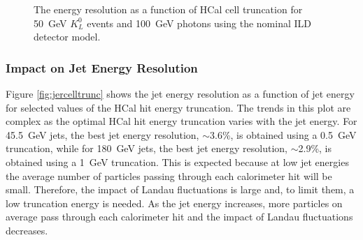 \begin{figure}[h!]
\caption[The energy resolution as a function of HCal cell truncation for \protect{} 50~GeV $K^{0}_{L}$ events and \protect{} 100~GeV photons using the nominal ILD detector model.]{The energy resolution as a function of HCal cell truncation for \protect{} 50~GeV $K^{0}_{L}$ events and \protect{} 100~GeV photons using the nominal ILD detector model.}
\label{fig:ercelltrunc}
\end{figure}


\subsubsection{Impact on Jet Energy Resolution}
Figure \ref{fig:jercelltrunc} shows the jet energy resolution as a function of jet energy for selected values of the HCal hit energy truncation.  The trends in this plot are complex as the optimal HCal hit energy truncation varies with the jet energy.  For 45.5~GeV jets, the best jet energy resolution, $\sim$3.6\%, is obtained using a 0.5~GeV truncation, while for 180~GeV jets, the best jet energy resolution, $\sim$2.9\%, is obtained using a 1~GeV truncation.  This is expected because at low jet energies the average number of particles passing through each calorimeter hit will be small.  Therefore, the impact of Landau fluctuations is large and, to limit them, a low truncation energy is needed.  As the jet energy increases, more particles on average pass through each calorimeter hit and the impact of Landau fluctuations decreases.  

